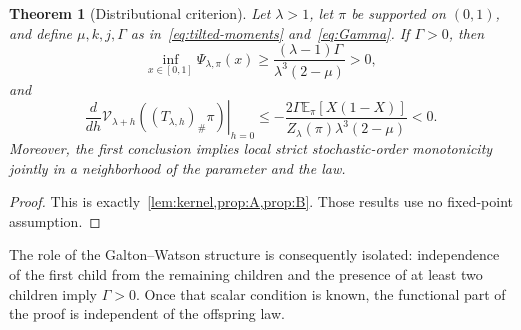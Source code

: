 \documentclass[11pt,a4paper]{article}
\numberwithin{equation}{section}
\theoremstyle{plain}
\newtheorem{theorem}{Theorem}[section]
\theoremstyle{definition}
\theoremstyle{remark}
\newcommand{\E}{\mathbb E}
\newcommand{\V}{\mathcal V}
\begin{document}
\begin{theorem}[Distributional criterion]\label{thm:distributional}
Let $\lambda>1$, let $\pi$ be supported on $(0,1)$, and define
$\mu,k,j,\Gamma$ as in~\eqref{eq:tilted-moments} and~\eqref{eq:Gamma}.
If $\Gamma>0$, then
\begin{equation}
 \inf_{x\in[0,1]}\Psi_{\lambda,\pi}(x)
 \ge\frac{(\lambda-1)\Gamma}{\lambda^3(2-\mu)}>0,
\end{equation}
and
\begin{equation}
 \left.\frac d{dh}\V_{\lambda+h}
       ((T_{\lambda,h})_\#\pi)\right|_{h=0}
 \le-\frac{2\Gamma\E_\pi[X(1-X)]}
 {Z_\lambda(\pi)\lambda^3(2-\mu)}<0.
\end{equation}
Moreover, the first conclusion implies local strict stochastic-order
monotonicity jointly in a neighborhood of the parameter and the law.
\end{theorem}
\begin{proof}
This is exactly~\cref{lem:kernel,prop:A,prop:B}.  Those results use no
fixed-point assumption.
\end{proof}

The role of the Galton--Watson structure is consequently isolated:
independence of the first child from the remaining children and the
presence of at least two children imply $\Gamma>0$.  Once that scalar
condition is known, the functional part of the proof is independent of
the offspring law.
\end{document}

